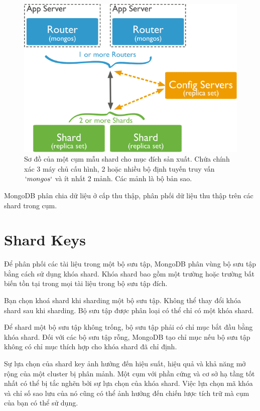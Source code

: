 \begin{figure}[h!]
\centering
\captionsetup{justification=centering,margin=1cm}
  	\includegraphics[scale=0.5]{charts/sharded-cluster-production-architecture.png}
  \caption{Sơ đồ của một cụm mẫu shard cho mục đích sản xuất. Chứa chính xác 3 máy chủ cấu hình, 2 hoặc nhiều bộ định tuyến truy vấn $`mongos`$ và ít nhất 2 mảnh. Các mảnh là bộ bản sao.}
  \end{figure}

MongoDB phân chia dữ liệu ở cấp thu thập, phân phối dữ liệu thu thập trên các shard trong cụm.

\section{Shard Keys}
Để phân phối các tài liệu trong một bộ sưu tập, MongoDB phân vùng bộ sưu tập bằng cách sử dụng khóa shard. Khóa shard bao gồm một trường hoặc trường bất biến tồn tại trong mọi tài liệu trong bộ sưu tập đích.

Bạn chọn khoá shard khi sharding một bộ sưu tập. Không thể thay đổi khóa shard sau khi sharding. Bộ sưu tập được phân loại có thể chỉ có một khóa shard. 

Để shard một bộ sưu tập không trống, bộ sưu tập phải có chỉ mục bắt đầu bằng khóa shard. Đối với các bộ sưu tập rỗng, MongoDB tạo chỉ mục nếu bộ sưu tập không có chỉ mục thích hợp cho khóa shard đã chỉ định. 

Sự lựa chọn của shard key ảnh hưởng đến hiệu suất, hiệu quả và khả năng mở rộng của một cluster bị phân mảnh. Một cụm với phần cứng và cơ sở hạ tầng tốt nhất có thể bị tắc nghẽn bởi sự lựa chọn của khóa shard. Việc lựa chọn mã khóa và chỉ số sao lưu của nó cũng có thể ảnh hưởng đến chiến lược tích trữ mà cụm của bạn có thể sử dụng.

